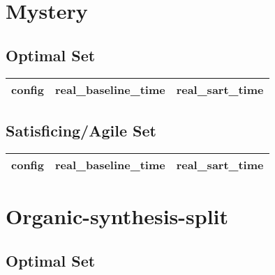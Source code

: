 \documentclass{article}
\begin{document}
                \newpage \section{Mystery}
                    \subsection*{Optimal Set}
                    
                            \begin{center}
                            \scriptsize
                            \begin{tabular}{r|r|r}
                            config & real\_baseline\_time & real\_sart\_time\\\midrule
                            
                            \end{tabular}
                            \end{center}
                    
                    
                    \subsection*{Satisficing/Agile Set}
                    
                            \begin{center}
                            \scriptsize
                            \begin{tabular}{r|r|r}
                            config & real\_baseline\_time & real\_sart\_time\\\midrule
                            
                            \end{tabular}
                            \end{center}
                    
                \newpage \section{Organic-synthesis-split}
                    \subsection*{Optimal Set}
                    
\end{document}
